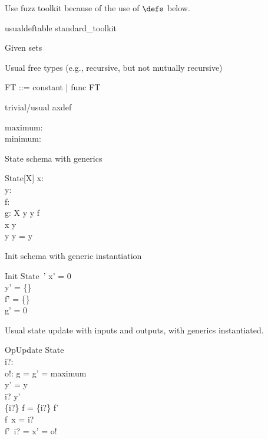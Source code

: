 \documentclass{article}
\begin{document}
Use fuzz toolkit because of the use of $\defs$ below.
%
\begin{zsection}
\SECTION usualdeftable \parents standard\_toolkit
\end{zsection}

Given sets
\begin{zed}
   [G]
\end{zed}

Usual free types (e.g., recursive, but not mutually recursive)
\begin{zed}
   FT ::= constant | func \ldata \nat \cross FT \rdata
\end{zed}

trivial/usual axdef
\begin{axdef}
   maximum: \nat \\
   minimum: \nat
\end{axdef}

State schema with generics
\begin{schema}{State}[X]
   x: \nat \\
   y: \power~\nat \\
   f: \nat \pfun \nat \\
   g: X
\where
   y \cross y \subseteq f \\
   x \in y \\ 
   y \cap y = y
\end{schema}

Init schema with generic instantiation
\begin{schema}{Init}
   State~'
\where
   x' = 0 \\
   y' = \{\} \\
   f' = \{\} \\
   g' = 0
\end{schema}

Usual state update with inputs and outputs, with generics instantiated.
\begin{schema}{OpUpdate}
   \Delta State \\
   i?: \nat \\
   o!: \nat
\where
   g = g' = maximum \\ %
   y' = y \\
   i? \in y' \\
   \{i?\} \dres f = \{i?\} \dres f' \\ %
   f~x = i? \\
   f'~i? = x' = o!
\end{schema}
\end{document}
